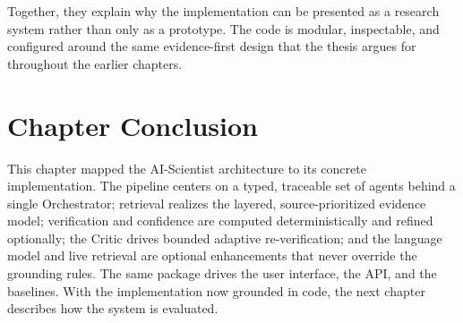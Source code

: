 Together, they explain why the implementation can be presented as a research system rather than only as a
prototype. The code is modular, inspectable, and configured around the same evidence-first design that the thesis
argues for throughout the earlier chapters.

\section{Chapter Conclusion }

This chapter mapped the AI-Scientist architecture to its concrete implementation. The pipeline centers on a typed,
traceable set of agents behind a single Orchestrator; retrieval realizes the layered, source-prioritized evidence
model; verification and confidence are computed deterministically and refined optionally; the Critic drives bounded
adaptive re-verification; and the language model and live retrieval are optional enhancements that never override
the grounding rules. The same package drives the user interface, the API, and the baselines. With the
implementation now grounded in code, the next chapter describes how the system is evaluated.
